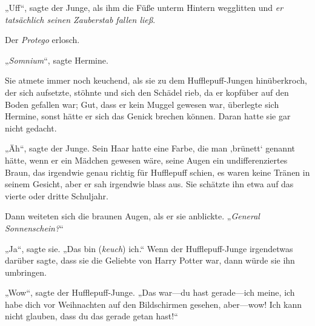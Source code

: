 „Uff“, sagte der Junge, als ihm die Füße unterm Hintern wegglitten und \emph{er tatsächlich seinen Zauberstab fallen ließ}.

Der \emph{Protego} erlosch.

„\emph{Somnium}“, sagte Hermine.

Sie atmete immer noch keuchend, als sie zu dem Hufflepuff-Jungen hinüberkroch, der sich aufsetzte, stöhnte und sich den Schädel rieb, da er kopfüber auf den Boden gefallen war; Gut, dass er kein Muggel gewesen war, überlegte sich Hermine, sonst hätte er sich das Genick brechen können. Daran hatte sie gar nicht gedacht.

„Äh“, sagte der Junge. Sein Haar hatte eine Farbe, die man ‚brünett‘ genannt hätte, wenn er ein Mädchen gewesen wäre, seine Augen ein undifferenziertes Braun, das irgendwie genau richtig für Hufflepuff schien, es waren keine Tränen in seinem Gesicht, aber er sah irgendwie blass aus. Sie schätzte ihn etwa auf das vierte oder dritte Schuljahr.

Dann weiteten sich die braunen Augen, als er sie anblickte. „\emph{General Sonnenschein?}“

„Ja“, sagte sie. „Das bin (\emph{keuch}) ich.“ Wenn der Hufflepuff-Junge irgendetwas darüber sagte, dass sie die Geliebte von Harry Potter war, dann würde sie ihn umbringen.

„Wow“, sagte der Hufflepuff-Junge. „Das war—du hast gerade—ich meine, ich habe dich vor Weihnachten auf den Bildschirmen gesehen, aber—wow! Ich kann nicht glauben, dass du das gerade getan hast!“

